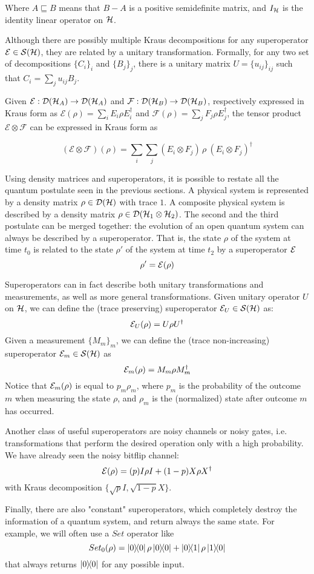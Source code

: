 Where $A \sqsubseteq B$ means that $B - A$ is a positive semidefinite matrix, and $I_{\mathcal{H}}$ is the identity linear operator on $\mathcal{H}$.

Although there are possibly multiple Kraus decompositions for any superoperator $\mathcal{E} \in \mathcal{S}(\mathcal{H})$, they are related by a unitary transformation.
Formally, for any two set of decompositions $\{C_i\}_i$ and $\{B_j\}_j$, there is a unitary matrix $U = \{u_{ij}\}_{ij}$ such that $C_i = \sum_j u_{ij} B_j$.

Given $\mathcal{E}: \mathcal{D}(\mathcal{H}_A) \rightarrow \mathcal{D}(\mathcal{H}_A)$ and $\mathcal{F}: \mathcal{D}(\mathcal{H}_B) \rightarrow \mathcal{D}(\mathcal{H}_B)$,
respectively expressed in Kraus form as $\mathcal{E}(\rho) = \sum_i E_i \rho E_i^\dag$ and $\mathcal{F}(\rho) = \sum_j F_j \rho E_j^\dag$, the tensor product $\mathcal{E} \otimes \mathcal{F}$
can be expressed in Kraus form as 

\[
  (\mathcal{E} \otimes \mathcal{F})(\rho) = \sum_i \sum_j (E_i \otimes F_j)\,\rho\:(E_i \otimes F_j)^\dag
\]


Using density matrices and superoperators, it is possible to restate all the quantum postulate seen in the previous sections. A physical system is represented by a density matrix $\rho \in \mathcal{D}(\mathcal{H})$ with trace $1$. A composite physical  system is described by a density matrix $\rho \in \mathcal{D}(\mathcal{H}_1 \otimes \mathcal{H}_2)$. The second and the third postulate can be merged together: the evolution of an open quantum system can always be described by a superoperator. That is, the state $\rho$ of the system at time $t_0$ is related to the state $\rho'$ of the system at time $t_2$ by a superoperator $\mathcal{E}$
\[
	\rho' = \mathcal{E}(\rho)
\]



Superoperators can in fact describe both unitary transformations and measurements, as well as more general transformations. Given unitary operator $U$ on $\mathcal{H}$, we can define  the (trace preserving) superoperator $\mathcal{E}_U \in \mathcal{S}(\mathcal{H})$ as:
\[ \mathcal{E}_U(\rho) = U \rho U^\dagger\]
Given a measurement $\{M_m\}_m$, we can define the (trace non-increasing) superoperator $\mathcal{E}_m \in \mathcal{S}(\mathcal{H})$ as 
\[\mathcal{E}_m(\rho) = M_m\rho M_m^\dagger\]
Notice that $\mathcal{E}_m(\rho)$ is equal to $p_m\rho_m$, where $p_m$ is the probability of the outcome $m$ when measuring the state $\rho$, and $\rho_m$ is the (normalized) state after outcome $m$ has occurred. 


Another class of useful superoperators are noisy channels or noisy gates, i.e. transformations that perform the desired operation only with a high probability. We have already seen the noisy bitflip channel: 
\[\mathcal{E}(\rho) = (p) 
I\rho I
+
(1-p)
X \rho X^\dagger
\]
with Kraus decomposition $\{\sqrt{p}I, \sqrt{1-p}X\}$.


Finally, there are also "constant" superoperators, which completely destroy the information of a quantum system, and return always the same state. For example, we will often use a $ Set$ operator like
\[Set_0(\rho) = \proj{0}\rho\proj{0} + \ketbra{0}{1}\rho\ketbra{1}{0}\]
that always returns $\ket{0}\!\!\bra{0}$ for any possible input.
